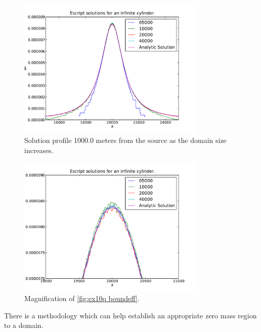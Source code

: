 \begin{figure}[ht]
\centering
\includegraphics[width=0.8\textwidth]{figures/ex10q_boundeff.pdf}
\caption{Solution profile 1000.0 meters from the source as the domain size
increases.}
\label{fig:ex10q boundeff}
\end{figure}

\begin{figure}[ht]
\centering
\includegraphics[width=0.8\textwidth]{figures/ex10q_boundeff_zoom.pdf}
\caption{Magnification of \autoref{fig:ex10q boundeff}.}
\label{fig:ex10q boundeff zoom}
\end{figure}

There is a methodology which can help establish an appropriate zero mass region
to a domain. 
\clearpage